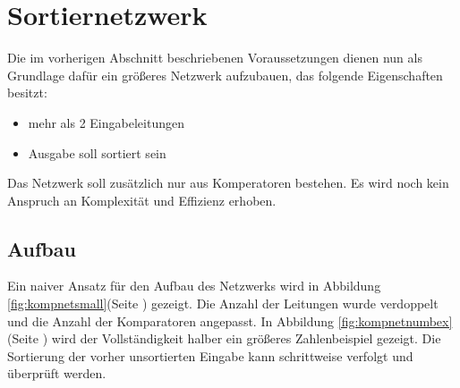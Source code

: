 \documentclass[11pt]{article}
\begin{document}
\section{Sortiernetzwerk}
Die im vorherigen Abschnitt beschriebenen Voraussetzungen dienen nun als Grundlage dafür ein größeres Netzwerk aufzubauen, das folgende Eigenschaften besitzt:
\begin{itemize}
\item mehr als 2 Eingabeleitungen
\item Ausgabe soll sortiert sein
\end{itemize}
Das Netzwerk soll zusätzlich nur aus Komperatoren bestehen. Es wird noch kein Anspruch an Komplexität und Effizienz erhoben.
\FloatBarrier
\subsection{Aufbau}
Ein naiver Ansatz für den Aufbau des Netzwerks wird in Abbildung \ref{fig:kompnetsmall}(Seite \pageref{fig:kompnetsmall}) gezeigt. Die Anzahl der Leitungen wurde verdoppelt und die Anzahl der Komparatoren angepasst. In Abbildung \ref{fig:kompnetnumbex} (Seite \pageref{fig:kompnetnumbex}) wird der Vollständigkeit halber ein größeres Zahlenbeispiel gezeigt. Die Sortierung der vorher unsortierten Eingabe kann schrittweise verfolgt und überprüft werden.
\end{document}
